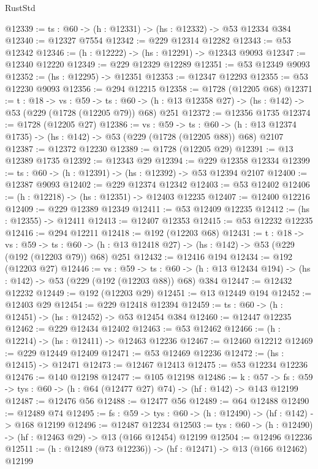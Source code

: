 \begin{lexlean}{RustStd}
\begin{coremodule}
@12339 := {ts : @60} -> (h : @12331) -> (hs : @12332) -> @53 @12334 @384
@12340 := @12327 @7554
@12342 := @229 @12314 @12282
@12343 := @53 @12342
@12346 := (h : @12222) -> (hs : @12291) -> @12343 @9093
@12347 := @12340 @12220
@12349 := @229 @12329 @12289
@12351 := @53 @12349 @9093
@12352 := (hs : @12295) -> @12351
@12353 := @12347 @12293
@12355 := @53 @12230 @9093
@12356 := @294 @12215
@12358 := @1728 (@12205 @68)
@12371 := {t : @18} ->
  {vs : @59} ->
  {ts : @60} -> (h : @13 @12358 @27) -> (hs : @142) -> @53 (@229 (@1728 (@12205 @79)) @68) @251
@12372 := @12356 @1735
@12374 := @1728 (@12205 @27)
@12386 := {vs : @59} ->
  {ts : @60} -> (h : @13 @12374 @1735) -> (hs : @142) -> @53 (@229 (@1728 (@12205 @88)) @68) @2107
@12387 := @12372 @12230
@12389 := @1728 (@12205 @29)
@12391 := @13 @12389 @1735
@12392 := @12343 @29
@12394 := @229 @12358 @12334
@12399 := {ts : @60} -> (h : @12391) -> (hs : @12392) -> @53 @12394 @2107
@12400 := @12387 @9093
@12402 := @229 @12374 @12342
@12403 := @53 @12402
@12406 := (h : @12218) -> (hs : @12351) -> @12403 @12235
@12407 := @12400 @12216
@12409 := @229 @12389 @12349
@12411 := @53 @12409 @12235
@12412 := (hs : @12355) -> @12411
@12413 := @12407 @12353
@12415 := @53 @12232 @12235
@12416 := @294 @12211
@12418 := @192 (@12203 @68)
@12431 := {t : @18} ->
  {vs : @59} ->
  {ts : @60} -> (h : @13 @12418 @27) -> (hs : @142) -> @53 (@229 (@192 (@12203 @79)) @68) @251
@12432 := @12416 @194
@12434 := @192 (@12203 @27)
@12446 := {vs : @59} ->
  {ts : @60} -> (h : @13 @12434 @194) -> (hs : @142) -> @53 (@229 (@192 (@12203 @88)) @68) @384
@12447 := @12432 @12232
@12449 := @192 (@12203 @29)
@12451 := @13 @12449 @194
@12452 := @12403 @29
@12454 := @229 @12418 @12394
@12459 := {ts : @60} -> (h : @12451) -> (hs : @12452) -> @53 @12454 @384
@12460 := @12447 @12235
@12462 := @229 @12434 @12402
@12463 := @53 @12462
@12466 := (h : @12214) -> (hs : @12411) -> @12463 @12236
@12467 := @12460 @12212
@12469 := @229 @12449 @12409
@12471 := @53 @12469 @12236
@12472 := (hs : @12415) -> @12471
@12473 := @12467 @12413
@12475 := @53 @12234 @12236
@12476 := @140 @12198
@12477 := @105 @12198
@12486 := {k : @57} ->
  {fs : @59} -> {tys : @60} -> (h : @64 (@12477 @27) @74) -> (hf : @142) -> @143 @12199
@12487 := @12476 @56
@12488 := @12477 @56
@12489 := @64 @12488
@12490 := @12489 @74
@12495 := {fs : @59} -> {tys : @60} -> (h : @12490) -> (hf : @142) -> @168 @12199
@12496 := @12487 @12234
@12503 := {tys : @60} -> (h : @12490) -> (hf : @12463 @29) -> @13 (@166 @12454) @12199
@12504 := @12496 @12236
@12511 := (h : @12489 (@73 @12236)) -> (hf : @12471) -> @13 (@166 @12462) @12199

\end{coremodule}
\end{lexlean}
